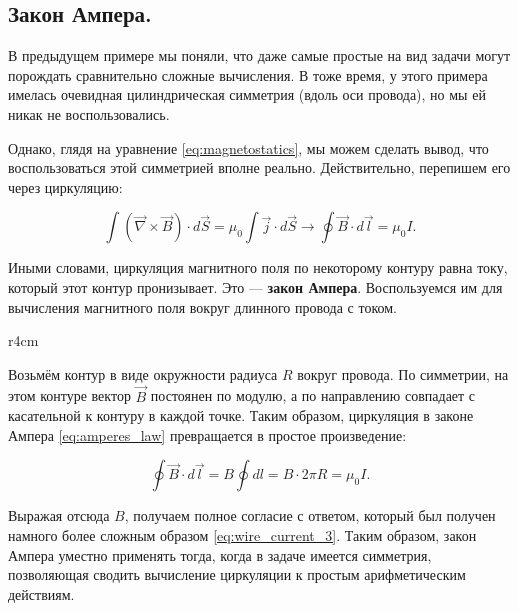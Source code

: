 \documentclass[a4paper,12pt]{article}
\newcommand{\vn}{\vec{\nabla}}
\begin{document}
\subsection{Закон Ампера.}
\label{sec:amperes_law}

В предыдущем примере мы поняли, что даже самые простые на вид задачи
могут порождать сравнительно сложные вычисления. В тоже время, у этого
примера имелась очевидная цилиндрическая симметрия (вдоль оси
провода), но мы ей никак не воспользовались. 

Однако, глядя на уравнение \eqref{eq:magnetostatics}, мы можем сделать
вывод, что воспользоваться этой симметрией вполне
реально. Действительно, перепишем его через циркуляцию: 

\begin{equation}
  \label{eq:amperes_law}
  \int \left( \vn \times \vec{B} \right) \cdot d \vec{S} =
  \mu_0 \int \vec{j} \cdot d\vec{S} \rightarrow  \oint
  \vec{B} \cdot d\vec{l} = \mu_0 I.
\end{equation}

Иными словами, циркуляция магнитного поля по некоторому контуру равна
току, который этот контур пронизывает. Это --- \textbf{закон
  Ампера}. Воспользуемся им для вычисления магнитного поля вокруг
длинного провода с током. 

\begin{wrapfigure}{r}{4cm}
\centering
{}
\label{fig:current_wire_field}
\end{wrapfigure}

Возьмём контур в виде окружности радиуса $R$ вокруг провода. По
симметрии, на этом контуре вектор $\vec{B}$ постоянен по модулю, а по
направлению совпадает с касательной к контуру в каждой точке. Таким
образом, циркуляция в законе Ампера \eqref{eq:amperes_law}
превращается в простое произведение:

\begin{equation}
  \label{eq:wire_current_ampere}
  \oint \vec{B} \cdot d\vec{l} = B \oint dl = B\cdot 2\pi R = \mu_0 I.
\end{equation}

Выражая отсюда $B$, получаем полное согласие с ответом, который был
получен намного более сложным образом \eqref{eq:wire_current_3}. Таким
образом, закон Ампера уместно применять тогда, когда в задаче имеется
симметрия, позволяющая сводить вычисление циркуляции к простым
арифметическим действиям. 
\end{document}
